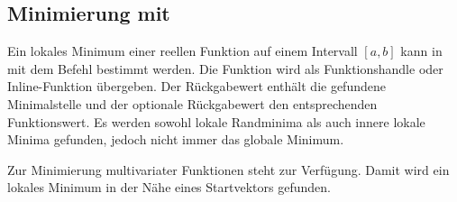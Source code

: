 \pagebreak

\subsection{%
    Minimierung mit \matlab{}%
}

Ein lokales Minimum einer reellen Funktion auf einem Intervall $[a, b]$ kann
in \matlab{} mit dem Befehl  bestimmt
werden.
Die Funktion  wird als Funktionshandle oder Inline-Funktion übergeben.
Der Rückgabewert  enthält die gefundene Minimalstelle und der optionale
Rückgabewert  den entsprechenden Funktionswert.
Es werden sowohl lokale Randminima als auch innere lokale Minima gefunden,
jedoch nicht immer das globale Minimum.

Zur Minimierung multivariater Funktionen steht
 zur Verfügung.
Damit wird ein lokales Minimum in der Nähe eines Startvektors 
gefunden.

\pagebreak
